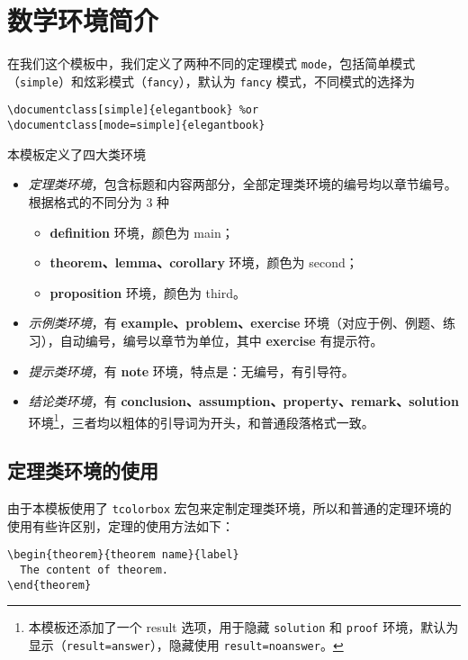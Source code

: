 \documentclass[lang=cn,10pt]{elegantbook}
\begin{document}
\section{数学环境简介}

在我们这个模板中，我们定义了两种不同的定理模式 \lstinline{mode}，包括简单模式（\lstinline{simple}）和炫彩模式（\lstinline{fancy}），默认为 \lstinline{fancy} 模式，不同模式的选择为
\begin{lstlisting}
\documentclass[simple]{elegantbook} %or
\documentclass[mode=simple]{elegantbook}
\end{lstlisting}

本模板定义了四大类环境

\begin{itemize}
  \item \textit{定理类环境}，包含标题和内容两部分，全部定理类环境的编号均以章节编号。根据格式的不同分为 3 种
    \begin{itemize}
      \item \textcolor{main}{\textbf{definition}} 环境，颜色为 \textcolor{main}{main}；
      \item \textcolor{second}{\textbf{theorem、lemma、corollary}} 环境，颜色为 \textcolor{second} {second}；
      \item \textcolor{third}{\textbf{proposition}} 环境，颜色为 \textcolor{third}{third}。
    \end{itemize}
  \item \textit{示例类环境}，有 \textbf{example、problem、exercise} 环境（对应于例、例题、练习），自动编号，编号以章节为单位，其中 \textbf{exercise} 有提示符。
  \item \textit{提示类环境}，有 \textbf{note} 环境，特点是：无编号，有引导符。
  \item \textit{结论类环境}，有 \textbf{conclusion、assumption、property、remark、solution} 环境\footnote{本模板还添加了一个 result 选项，用于隐藏 \lstinline{solution} 和 \lstinline{proof} 环境，默认为显示（\lstinline{result=answer}），隐藏使用 \lstinline{result=noanswer}。}，三者均以粗体的引导词为开头，和普通段落格式一致。
\end{itemize}

\subsection{定理类环境的使用}

由于本模板使用了 \lstinline{tcolorbox} 宏包来定制定理类环境，所以和普通的定理环境的使用有些许区别，定理的使用方法如下：
\begin{lstlisting}
\begin{theorem}{theorem name}{label}
  The content of theorem.
\end{theorem}
\end{lstlisting}
\end{document}
